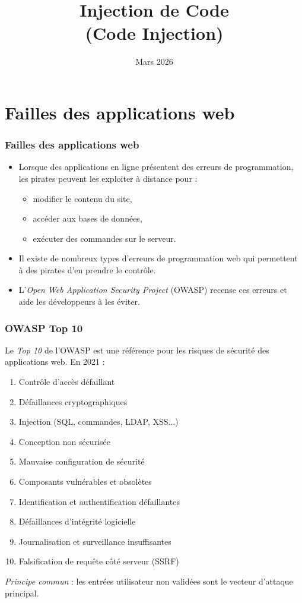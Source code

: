 \documentclass{beamer}
\title{Injection de Code \\ {\small (Code Injection)}}
\date{Mars 2026}
\def\emptyline{\vspace{10pt}}
\newcommand{\blue}[1]{\textit{\color{blue}#1}}
\begin{document}
\maketitle


\section{Failles des applications web}

\begin{frame}
\frametitle{Failles des applications web}

\begin{itemize}
\item Lorsque des applications en ligne présentent des erreurs de programmation, les pirates peuvent les exploiter à distance pour :
\begin{itemize}
\item modifier le contenu du site,
\item accéder aux bases de données,
\item exécuter des commandes sur le serveur.
\end{itemize}
\item Il existe de nombreux types d'erreurs de programmation web qui permettent à des pirates d'en prendre le contrôle.
\item L'\textit{Open Web Application Security Project} (OWASP) recense ces erreurs et aide les développeurs à les éviter.
\end{itemize}
\end{frame}


\begin{frame}
\frametitle{OWASP Top 10}

Le \textit{Top 10} de l'OWASP est une référence pour les risques de sécurité des applications web. En 2021 :
\begin{enumerate}
\item \alert{Contrôle d'accès défaillant}
\item Défaillances cryptographiques
\item \alert{Injection} (SQL, commandes, LDAP, XSS...)
\item Conception non sécurisée
\item Mauvaise configuration de sécurité
\item Composants vulnérables et obsolètes
\item Identification et authentification défaillantes
\item Défaillances d'intégrité logicielle
\item Journalisation et surveillance insuffisantes
\item \alert{Falsification de requête côté serveur (SSRF)}
\end{enumerate}
\emptyline
\blue{Principe commun} : les entrées utilisateur non validées sont le vecteur d'attaque principal.
\end{frame}
\end{document}

